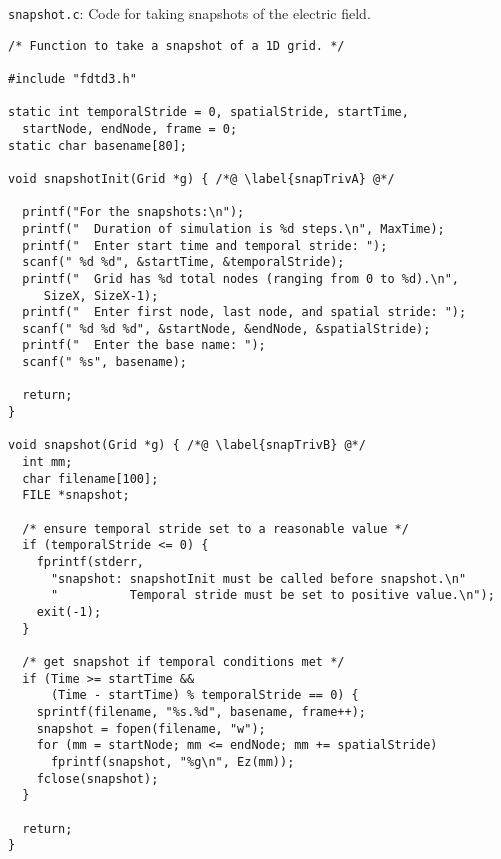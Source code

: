 \begin{program}
{\tt snapshot.c}: Code for taking snapshots of the electric field.
\label{pro:snapTrivial}
\codemiddle
\begin{lstlisting}
/* Function to take a snapshot of a 1D grid. */

#include "fdtd3.h"

static int temporalStride = 0, spatialStride, startTime,
  startNode, endNode, frame = 0;
static char basename[80];

void snapshotInit(Grid *g) { /*@ \label{snapTrivA} @*/
  
  printf("For the snapshots:\n");
  printf("  Duration of simulation is %d steps.\n", MaxTime);
  printf("  Enter start time and temporal stride: ");
  scanf(" %d %d", &startTime, &temporalStride);
  printf("  Grid has %d total nodes (ranging from 0 to %d).\n",
	 SizeX, SizeX-1);
  printf("  Enter first node, last node, and spatial stride: ");
  scanf(" %d %d %d", &startNode, &endNode, &spatialStride);
  printf("  Enter the base name: ");
  scanf(" %s", basename);

  return;
}

void snapshot(Grid *g) { /*@ \label{snapTrivB} @*/
  int mm;
  char filename[100];
  FILE *snapshot;

  /* ensure temporal stride set to a reasonable value */
  if (temporalStride <= 0) {
    fprintf(stderr,
      "snapshot: snapshotInit must be called before snapshot.\n"
      "          Temporal stride must be set to positive value.\n");
    exit(-1);
  }

  /* get snapshot if temporal conditions met */
  if (Time >= startTime && 
      (Time - startTime) % temporalStride == 0) {
    sprintf(filename, "%s.%d", basename, frame++);
    snapshot = fopen(filename, "w");
    for (mm = startNode; mm <= endNode; mm += spatialStride)
      fprintf(snapshot, "%g\n", Ez(mm));
    fclose(snapshot);
  }

  return;
}
\end{lstlisting}
\end{program}

